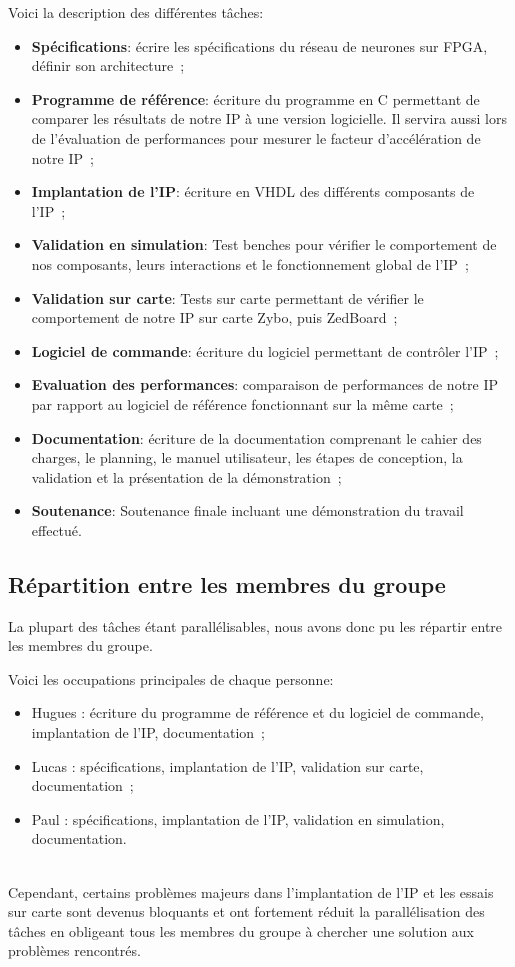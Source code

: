 Voici la description des différentes tâches:
\begin{itemize}
	\item \textbf{Spécifications}: écrire les spécifications du
		réseau de neurones sur FPGA, définir son architecture~;
	\item \textbf{Programme de référence}: écriture du programme en C
		permettant de comparer les résultats de notre IP à une version
		logicielle. Il servira aussi lors de l'évaluation de
		performances pour mesurer le facteur d'accélération de notre IP~;
	\item \textbf{Implantation de l'IP}: écriture en VHDL des différents
		composants de l'IP~;
	\item \textbf{Validation en simulation}: Test benches pour vérifier le
		comportement de nos composants, leurs interactions et le
		fonctionnement global de l'IP~;
	\item \textbf{Validation sur carte}: Tests sur carte permettant de
		vérifier le comportement de notre IP sur carte Zybo,
		puis ZedBoard~;
	\item \textbf{Logiciel de commande}: écriture du logiciel permettant de
		contrôler l'IP~;
	\item \textbf{Evaluation des performances}: comparaison de performances
		de notre IP par rapport au logiciel de référence fonctionnant
		sur la même carte~;
	\item \textbf{Documentation}: écriture de la documentation comprenant
		le cahier des charges, le planning, le manuel utilisateur,
		les étapes de conception, la validation et la présentation de la
		démonstration~;
	\item \textbf{Soutenance}: Soutenance finale incluant une démonstration
		du travail effectué.
\end{itemize}


\subsection{Répartition entre les membres du groupe}

La plupart des tâches étant parallélisables, nous avons donc pu les répartir
entre les membres du groupe.

Voici les occupations principales de chaque personne:
\begin{itemize}
	\item Hugues : écriture du programme de référence et du logiciel de
		commande, implantation de l'IP, documentation~;
	\item Lucas : spécifications, implantation de l'IP, validation sur
		carte, documentation~;
	\item Paul : spécifications, implantation de l'IP, validation en
		simulation, documentation.
\end{itemize}
~\\
Cependant, certains problèmes majeurs dans l'implantation de l'IP et les essais
sur carte sont devenus bloquants et ont fortement réduit la parallélisation des
tâches en obligeant tous les membres du groupe à chercher une solution aux
problèmes rencontrés.

